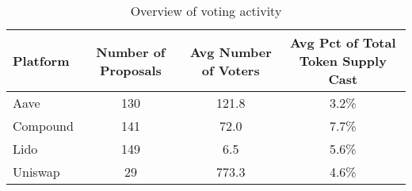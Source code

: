 \begin{table}
\caption{Overview of voting activity}
\label{tab:summary}
\begin{tabular}{|l|c|c|c|}
\hline
Platform & Number of Proposals & Avg Number of Voters & Avg Pct of 
 Total Token Supply Cast \\ \hline

Aave & 130 & 121.8 & 3.2\% \\ \hline
Compound & 141 & 72.0 & 7.7\% \\ \hline
Lido & 149 & 6.5 & 5.6\% \\ \hline
Uniswap & 29 & 773.3 & 4.6\% \\ \hline

\end{tabular}
\end{table}
